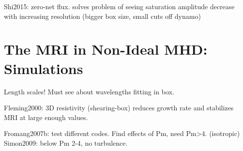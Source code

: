 Shi2015: zero-net flux. solves problem of seeing saturation amplitude decrease with increasing resolution (bigger box size, small cuts off dynamo)

\section{The MRI in Non-Ideal MHD: Simulations}
Length scales!
Must see about wavelengths fitting in box.



Fleming2000: 3D resistivity (shearing-box) reduces growth rate and stabilizes MRI at large enough values. 

Fromang2007b: test different codes. Find effects of Pm, need Pm>4. (isotropic)
Simon2009: below Pm 2-4, no turbulence.


